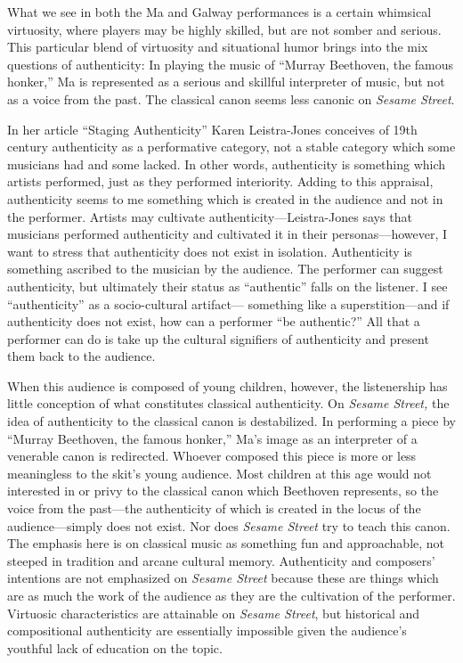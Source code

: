 \documentclass[12pt,letterpaper]{article}
\begin{document}
        What we see in both the Ma and Galway performances is a certain 
	whimsical virtuosity, where players may be highly skilled, but are not
	somber and serious. This particular blend of virtuosity and situational
	humor brings into the mix questions of authenticity: In playing the
	music of ``Murray Beethoven, the famous honker,'' Ma is represented as a
	serious and skillful interpreter of music, but not as a voice from the 
	past. The classical canon seems less canonic on \textit{Sesame Street}.

        In her article ``Staging Authenticity'' Karen Leistra-Jones conceives of
	19th century authenticity as a performative category, not a stable 
	category which some musicians had and some 
	lacked.\autocite[400]{Jones2013} In other words, authenticity is 
	something which artists performed, just as they performed interiority. 
	Adding to this appraisal, authenticity seems to me something which is 
	created in the audience and not in the performer. Artists may cultivate
	authenticity---Leistra-Jones says that musicians performed authenticity
	and cultivated it in their personas---however, I want to stress that 
	authenticity does not exist in isolation. Authenticity is something 
	ascribed to the musician by the audience. The performer can suggest 
	authenticity, but ultimately their status as ``authentic'' falls on the 
	listener. I see ``authenticity'' as a socio-cultural artifact---
	something like a superstition---and if authenticity does not exist, how 
	can a performer ``be authentic?'' All that a performer can do is take 
	up the cultural signifiers of authenticity and present them back to the 
	audience.

        When this audience is composed of young children, however, the 
	listenership has little conception of what constitutes classical 
	authenticity. On \textit{Sesame Street,} the idea of authenticity to the
	classical canon is destabilized. In performing a piece by ``Murray 
	Beethoven, the famous honker,'' Ma's image as an interpreter of a 
	venerable canon is redirected. Whoever composed this piece is more or 
	less meaningless to the skit's young audience. Most children at this age
	would not interested in or privy to the classical canon which Beethoven 
	represents, so the voice from the past---the authenticity of which is 
	created in the locus of the audience---simply does not exist. Nor does 
	\textit{Sesame Street} try to teach this canon. The emphasis here is on 
	classical music as something fun and approachable, not steeped in 
	tradition and arcane cultural memory. Authenticity and composers' 
	intentions are not emphasized on \textit{Sesame Street} because these 
	are things which are as much the work of the audience as they are the 
	cultivation of the performer. Virtuosic characteristics 
	are attainable on \textit{Sesame Street}, but historical and 
	compositional authenticity are essentially impossible given the 
	audience's youthful lack of education on the topic. 
	
\end{document}

